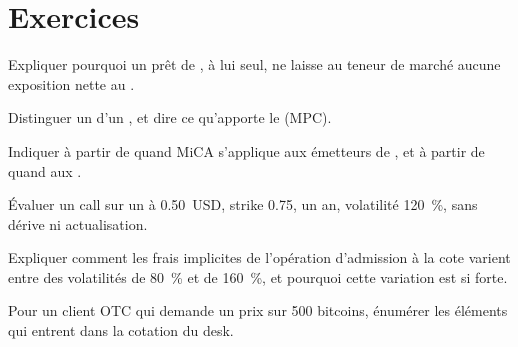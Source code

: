 \section{Exercices}

\begin{exercise}[$\star$]\label{exo:m3:the-crypto-trading-business:1}
Expliquer pourquoi un prêt de , à lui seul, ne laisse au teneur de marché aucune exposition nette au .
\end{exercise}

\begin{exercise}[$\star$]\label{exo:m3:the-crypto-trading-business:2}
Distinguer un  d'un , et dire ce qu'apporte le  (MPC).
\end{exercise}

\begin{exercise}[$\star$]\label{exo:m3:the-crypto-trading-business:3}
Indiquer à partir de quand MiCA s'applique aux émetteurs de , et à partir de quand aux .
\end{exercise}

\begin{exercise}[$\star\star$]\label{exo:m3:the-crypto-trading-business:4}
Évaluer un call sur un  à 0.50~USD, strike 0.75, un an, volatilité 120~\%, sans dérive ni actualisation.
\end{exercise}

\begin{exercise}[$\star\star$]\label{exo:m3:the-crypto-trading-business:5}
Expliquer comment les frais implicites de l'opération d'admission à la cote varient entre des volatilités de 80~\% et de 160~\%, et pourquoi cette variation est si forte.
\end{exercise}

\begin{exercise}[$\star\star$]\label{exo:m3:the-crypto-trading-business:6}
Pour un client OTC qui demande un prix sur 500 bitcoins, énumérer les éléments qui entrent dans la cotation du desk.
\end{exercise}

